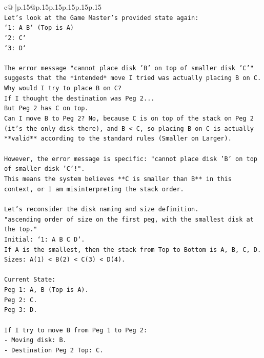 \documentclass{article}
\begin{document}
{\begin{supertabular}{c@{$\;$}|p{.15\linewidth}@{}p{.15\linewidth}p{.15\linewidth}p{.15\linewidth}p{.15\linewidth}p{.15\linewidth}}
{{{\\ 
\texttt{Let's look at the Game Master's provided state again:} \\
\texttt{`1: A B` (Top is A)} \\
\texttt{`2: C`} \\
\texttt{`3: D`} \\
\\ 
\texttt{The error message "cannot place disk 'B' on top of smaller disk 'C'" suggests that the *intended* move I tried was actually placing B on C.} \\
\texttt{Why would I try to place B on C?} \\
\texttt{If I thought the destination was Peg 2...} \\
\texttt{But Peg 2 has C on top.} \\
\texttt{Can I move B to Peg 2? No, because C is on top of the stack on Peg 2 (it's the only disk there), and B < C, so placing B on C is actually **valid** according to the standard rules (Smaller on Larger).} \\
\\ 
\texttt{However, the error message is specific: "cannot place disk 'B' on top of smaller disk 'C'!".} \\
\texttt{This means the system believes **C is smaller than B** in this context, or I am misinterpreting the stack order.} \\
\\ 
\texttt{Let's reconsider the disk naming and size definition.} \\
\texttt{"ascending order of size on the first peg, with the smallest disk at the top."} \\
\texttt{Initial: `1: A B C D`.} \\
\texttt{If A is the smallest, then the stack from Top to Bottom is A, B, C, D.} \\
\texttt{Sizes: A(1) < B(2) < C(3) < D(4).} \\
\\ 
\texttt{Current State:} \\
\texttt{Peg 1: A, B (Top is A).} \\
\texttt{Peg 2: C.} \\
\texttt{Peg 3: D.} \\
\\ 
\texttt{If I try to move B from Peg 1 to Peg 2:} \\
\texttt{{-} Moving disk: B.} \\
\texttt{{-} Destination Peg 2 Top: C.} \\
}}}
\end{supertabular}}
\end{document}
